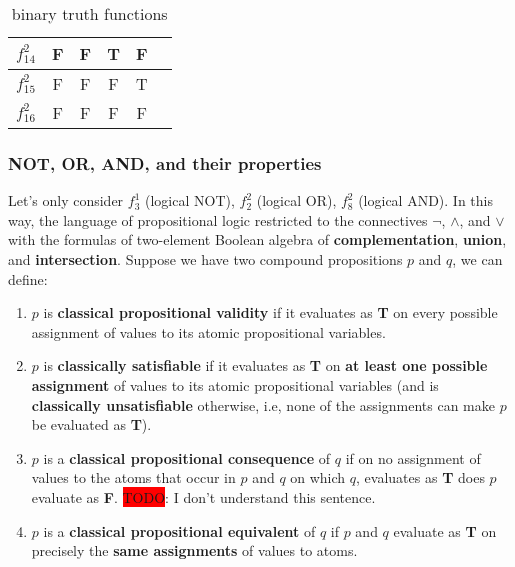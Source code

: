 \documentclass[12pt, letterpaper]{article}
\begin{document}
\begin{table}[H]
\begin{tabular}{|c|c|c|c|c|c|}
  $f_{14}^2$ & F                      & F                      & T                      & F                      &         \\ [0.5ex] \hline
  $f_{15}^2$ & F                      & F                      & F                      & T                      &         \\ [0.5ex] \hline
  $f_{16}^2$ & F                      & F                      & F                      & F                      &         \\ [0.5ex] \hline
  \end{tabular}
  \caption{binary truth functions}
  \label{table:binary_truth_functions}
\end{table}

\subsubsection{NOT, OR, AND, and their properties}

Let's only consider $f_3^1$ (logical NOT), $f_2^2$ (logical OR), $f_8^2$
(logical AND). In this way, the language of propositional logic restricted to
the connectives $\lnot$, $\land$, and $\lor$ with the formulas of two-element
Boolean algebra of \textbf{complementation}, \textbf{union}, and \textbf{
intersection}. Suppose we have two compound propositions $p$ and $q$, we can
define:
\begin{enumerate}
  \item $p$ is \textbf{classical propositional validity} if it evaluates as
    \textbf{T} on every possible assignment of values to its atomic
    propositional variables.
  \item $p$ is \textbf{classically satisfiable} if it evaluates as \textbf{T}
    on \textbf{at least one possible assignment} of values to its atomic
    propositional variables (and is \textbf{classically unsatisfiable}
    otherwise, i.e, none of the assignments can make $p$ be evaluated as
    \textbf{T}).
  \item $p$ is a \textbf{classical propositional consequence} of $q$ if on no
    assignment of values to the atoms that occur in $p$ and $q$ on which $q$,
    evaluates as \textbf{T} does $p$ evaluate as \textbf{F}.
    \colorbox{red}{TODO}: I don't understand this sentence.
  \item $p$ is a \textbf{classical propositional equivalent} of $q$ if $p$ and
    $q$ evaluate as \textbf{T} on precisely the \textbf{same assignments} of
    values to atoms.
\end{enumerate}
\end{document}
